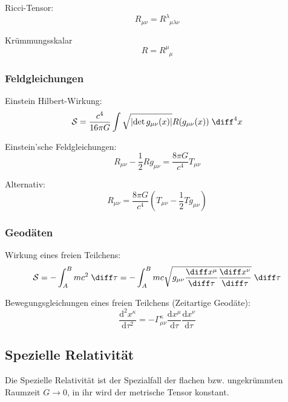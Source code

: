 \documentclass[11pt]{article}
\numberwithin{equation}{section}
\begin{document}
          Ricci-Tensor:
          \begin{equation}
            R_{\mu\nu} = R^\lambda_{\phantom{\lambda}\mu\lambda\nu}
          \end{equation}

          Krümmungsskalar
          \begin{equation}
            R = R^\mu_{\phantom{\mu}\mu}
          \end{equation}

        \subsubsection{Feldgleichungen}
          Einstein Hilbert-Wirkung:
          \begin{equation}
            \mathcal{S} = \frac{c^4}{16\pi G} \int \sqrt{\left|\det{g_{\mu\nu}(x)}\right|} R(g_{\mu\nu}(x))\;\diff^4 x
          \end{equation}

          Einstein'sche Feldgleichungen:
          \begin{equation}
            R_{\mu\nu} - \frac{1}{2} R g_{\mu\nu} = \frac{8\pi G}{c^4} T_{\mu\nu}
          \end{equation}

          Alternativ:
          \begin{equation}
            R_{\mu\nu} = \frac{8\pi G}{c^4} \left( T_{\mu\nu} - \frac{1}{2} T g_{\mu\nu} \right)
          \end{equation}


        \subsubsection{Geodäten}
          Wirkung eines freien Teilchens:
          \begin{equation}
            \mathcal{S} = -\int_A^B mc^2\;\diff \tau = -\int_A^B mc\sqrt{g_{\mu\nu} \tder{x^\mu}{\tau} \tder{x^\nu}{\tau}} \;\diff \tau
          \end{equation}

          Bewegungsgleichungen eines freien Teilchens (Zeitartige Geodäte):
          \begin{equation}
            \frac{\mathrm{d}^2 x^\kappa}{\mathrm{d}\tau^2}=-\Gamma_{\mu\nu}^{\kappa}\frac{\mathrm{d}x^\mu}{\mathrm{d}\tau}\frac{\mathrm{d}x^\nu}{\mathrm{d}\tau}
          \end{equation}

      \subsection{Spezielle Relativität}
        Die Spezielle Relativität ist der Spezialfall der flachen bzw. ungekrümmten Raumzeit $G\rightarrow 0$, in ihr wird der metrische Tensor konstant.
\end{document}
